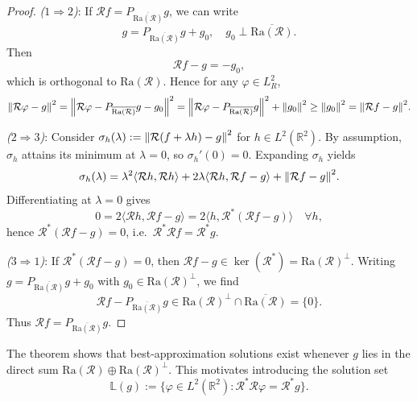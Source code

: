 \documentclass[12pt,a4paper]{article}
\begin{document}
\begin{proof}
    \emph{($1 \Rightarrow 2$)}:  
    If $\mathcal{R} f = P_{\overline{\mathrm{Ra}(\mathcal{R})}} g$, we can write
    \[
        g = P_{\overline{\mathrm{Ra}(\mathcal{R})}} g + g_0,
        \quad g_0 \perp \overline{\mathrm{Ra}(\mathcal{R})}.
    \]
    Then
    \[
        \mathcal{R} f - g = -g_0,
    \]
    which is orthogonal to $\mathrm{Ra}(\mathcal{R})$. Hence for any $\varphi \in L^2_R$,
    \[
        \norm{\mathcal{R}\varphi - g}^2 
        = \norm{\mathcal{R}\varphi - P_{\overline{\mathrm{Ra}(\mathcal{R})}} g - g_0}^2
        = \norm{\mathcal{R}\varphi - P_{\overline{\mathrm{Ra}(\mathcal{R})}} g}^2 + \norm{g_0}^2
        \geq \norm{g_0}^2 
        = \norm{\mathcal{R} f - g}^2.
    \]

    \emph{($2 \Rightarrow 3$)}:  
    Consider $\sigma_h(\lambda) := \norm{\mathcal{R}(f + \lambda h) - g}^2$ for $h \in L^2(\mathbb{R}^2)$.  
    By assumption, $\sigma_h$ attains its minimum at $\lambda = 0$, so $\sigma_h'(0) = 0$. Expanding $\sigma_h$ yields
    \[
        \sigma_h(\lambda) = \lambda^2 \langle \mathcal{R}h, \mathcal{R}h \rangle 
        + 2\lambda \langle \mathcal{R}h, \mathcal{R}f - g \rangle
        + \norm{\mathcal{R}f - g}^2.
    \]
    Differentiating at $\lambda = 0$ gives
    \[
        0 = 2 \langle \mathcal{R}h, \mathcal{R}f - g \rangle
        = 2 \langle h, \mathcal{R}^*(\mathcal{R} f - g) \rangle
        \quad \forall h,
    \]
    hence $\mathcal{R}^*(\mathcal{R}f - g) = 0$, i.e.\ $\mathcal{R}^*\mathcal{R}f = \mathcal{R}^* g$.

    \emph{($3 \Rightarrow 1$)}:  
    If $\mathcal{R}^*(\mathcal{R}f - g) = 0$, then $\mathcal{R}f - g \in \ker(\mathcal{R}^*) = \mathrm{Ra}(\mathcal{R})^\perp$.  
    Writing $g = P_{\overline{\mathrm{Ra}(\mathcal{R})}} g + g_0$ with $g_0 \in \mathrm{Ra}(\mathcal{R})^\perp$, we find
    \[
        \mathcal{R} f - P_{\overline{\mathrm{Ra}(\mathcal{R})}} g \in \mathrm{Ra}(\mathcal{R})^\perp \cap \overline{\mathrm{Ra}(\mathcal{R})} = \{0\}.
    \]
    Thus $\mathcal{R} f = P_{\overline{\mathrm{Ra}(\mathcal{R})}} g$.
\end{proof}

\medskip

The theorem shows that best-approximation solutions exist whenever $g$ lies in the direct sum $\mathrm{Ra}(\mathcal{R}) \oplus \mathrm{Ra}(\mathcal{R})^\perp$. This motivates introducing the solution set
\[
    \mathbb{L}(g) := \{ \varphi \in L^2(\mathbb{R}^2) : \mathcal{R}^*\mathcal{R}\varphi = \mathcal{R}^* g \}.
\]
\end{document}

